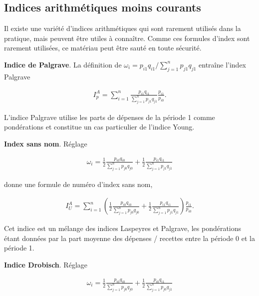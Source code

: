 \documentclass[]{article}
\begin{document}
\hypertarget{indices-arithmuxe9tiques-moins-courants}{%
\subsection{Indices arithmétiques moins courants}\label{indices-arithmuxe9tiques-moins-courants}}

Il existe une variété d'indices arithmétiques qui sont rarement utilisés dans la pratique, mais peuvent être utiles à connaître. Comme ces formules d'index sont rarement utilisées, ce matériau peut être sauté en toute sécurité.

\textbf{Indice de Palgrave}. La définition de \(\omega_{i} = p_{i1} q_{i1} / \sum_{j = 1}^{n} p_{j1} q_{j1}\) entraîne l'index Palgrave

\begin{align*}
I^{A}_{p} = \sum_{i = 1}^{n} \frac{p_{i1} q_{i1}}{\sum_{j = 1}^{n} p_{j1} q_{j1}} \frac{p_{i1}}{p_{i0}}.
\end{align*}

L'indice Palgrave utilise les parts de dépenses de la période 1 comme pondérations et constitue un cas particulier de l'indice Young.

\textbf{Index sans nom}. Réglage

\begin{align*}
\omega_{i} = \frac{1}{2} \frac{p_{i0} q_{i0}}{\sum_{j = 1}^{n} p_{j0} q_{j0}} + \frac{1}{2} \frac{p_{i1} q_{i1}}{\sum_{j = 1}^{n} p_{j1} q_{j1}}
\end{align*}

donne une formule de numéro d'index sans nom,

\begin{align*}
I^{A}_{U} = \sum_{i = 1}^{n} \left(\frac{1}{2} \frac{p_{i0} q_{i0}}{\sum_{j = 1}^{n} p_{j0} q_{j0}} + \frac{1}{2} \frac{p_{i1} q_{i1}}{\sum_{j = 1}^{n} p_{j1} q_{j1}} \right) \frac{p_{i1}}{p_{i0}}.
\end{align*}

Cet indice est un mélange des indices Laspeyres et Palgrave, les pondérations étant données par la part moyenne des dépenses / recettes entre la période 0 et la période 1.

\textbf{Indice Drobisch}. Réglage

\begin{align*}
\omega_{i} = \frac{1}{2} \frac{p_{i0} q_{i0}}{\sum_{j = 1}^{n} p_{j0} q_{j0}} + \frac{1}{2} \frac{p_{i0} q_{i1}}{\sum_{j = 1}^{n} p_{j0} q_{j1}}
\end{align*}
\end{document}
